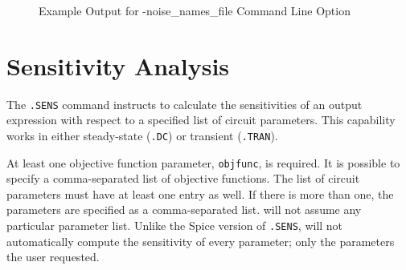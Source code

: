 \begin{figure}[htbp]
  \begin{centering}
\caption[Example Output for -noise\_names\_file Command Line Option]
{Example Output for -noise\_names\_file Command Line Option\label{NoiseNamesFile} }
\end{centering}
\end{figure}

\clearpage
\section{Sensitivity Analysis}
\label{SENS_Analysis}
\label{sensitivity_Overview}

The \texttt{.SENS}  command instructs \Xyce{} to
calculate the sensitivities of an output expression with respect to a
specified list of circuit parameters.  This capability works in either
steady-state (\texttt{.DC}) or transient (\texttt{.TRAN}).


At least one objective function parameter, \texttt{objfunc}, is
required.  It is possible to specify a comma-separated list of
objective functions.  The list of circuit parameters must have at
least one entry as well.  If there is more than one, the parameters
are specified as a comma-separated list.  \Xyce{} will not assume any
particular parameter list.  Unlike the Spice version of
\texttt{.SENS}, \Xyce{} will not automatically compute the sensitivity
of every parameter; only the parameters the user requested.

